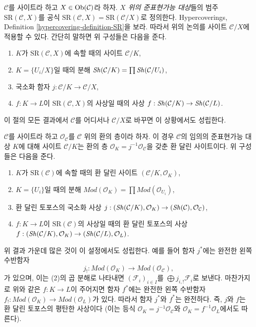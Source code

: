 \begin{remark}[대상 위에서의 변형]
\label{remark-semi-representable-over-object}
$\mathcal{C}$를 사이트라 하고 $X \in \mathop{\mathrm{Ob}}\nolimits(\mathcal{C})$라 하자.
{\it $X$ 위의 준표현가능 대상}들의 범주
$\text{SR}(\mathcal{C}, X)$를 공식
$\text{SR}(\mathcal{C}, X) = \text{SR}(\mathcal{C}/X)$로 정의한다.
Hypercoverings, Definition \ref{hypercovering-definition-SR}을 보라.
따라서 위의 논의를 사이트 $\mathcal{C}/X$에 적용할 수 있다.
간단히 말하면 위 구성들은 다음을 준다.
\begin{enumerate}
\item $K$가 $\text{SR}(\mathcal{C}, X)$에 속할 때의 사이트 $\mathcal{C}/K$,
\item $K = \{U_i/X\}$일 때의 분해
$\mathop{\mathit{Sh}}\nolimits(\mathcal{C}/K) = \prod \mathop{\mathit{Sh}}\nolimits(\mathcal{C}/U_i)$,
\item 국소화 함자 $j : \mathcal{C}/K \to \mathcal{C}/X$,
\item $f : K \to L$이 $\text{SR}(\mathcal{C}, X)$의 사상일 때의 사상
$f : \mathop{\mathit{Sh}}\nolimits(\mathcal{C}/K) \to \mathop{\mathit{Sh}}\nolimits(\mathcal{C}/L)$.
\end{enumerate}
이 절의 모든 결과에서 $\mathcal{C}$를 어디서나 $\mathcal{C}/X$로
바꾸면 이 상황에서도 성립한다.
\end{remark}

\begin{remark}[환 달린 변형]
\label{remark-semi-representable-ringed}
$\mathcal{C}$를 사이트라 하고 $\mathcal{O}_\mathcal{C}$를
$\mathcal{C}$ 위의 환의 층이라 하자. 이 경우 $\mathcal{C}$의 임의의
준표현가능 대상 $K$에 대해 사이트 $\mathcal{C}/K$는 환의 층
$\mathcal{O}_K = j^{-1}\mathcal{O}_\mathcal{C}$을 갖춘 환 달린 사이트이다.
위 구성들은 다음을 준다.
\begin{enumerate}
\item $K$가 $\text{SR}(\mathcal{C})$에 속할 때의 환 달린 사이트
$(\mathcal{C}/K, \mathcal{O}_K)$,
\item $K = \{U_i\}$일 때의 분해
$\textit{Mod}(\mathcal{O}_K) =
\prod \textit{Mod}(\mathcal{O}_{U_i})$,
\item 환 달린 토포스의 국소화 사상
$j : (\mathop{\mathit{Sh}}\nolimits(\mathcal{C}/K), \mathcal{O}_K) \to
(\mathop{\mathit{Sh}}\nolimits(\mathcal{C}), \mathcal{O}_\mathcal{C})$,
\item $f : K \to L$이 $\text{SR}(\mathcal{C})$의 사상일 때의
환 달린 토포스의 사상
$f : (\mathop{\mathit{Sh}}\nolimits(\mathcal{C}/K), \mathcal{O}_K) \to
(\mathop{\mathit{Sh}}\nolimits(\mathcal{C}/L), \mathcal{O}_L)$.
\end{enumerate}
위 결과 가운데 많은 것이 이 설정에서도 성립한다. 예를 들어
함자 $j^*$에는 완전한 왼쪽 수반함자
$$
j_! : \textit{Mod}(\mathcal{O}_K) \to \textit{Mod}(\mathcal{O}_\mathcal{C}),
$$
가 있으며, 이는 (2)의 곱 분해로 나타내면
$(\mathcal{F}_i)_{i \in I}$를 $\bigoplus j_{i, !}\mathcal{F}_i$로 보낸다.
마찬가지로 위와 같은 $f : K \to L$이 주어지면 함자 $f^*$에는
완전한 왼쪽 수반함자
$f_! : \textit{Mod}(\mathcal{O}_K) \to \textit{Mod}(\mathcal{O}_L)$가 있다.
따라서 함자 $j^*$와 $f^*$는 완전하다. 즉, $j$와 $f$는
환 달린 토포스의 평탄한 사상이다
(이는 등식 $\mathcal{O}_K = j^{-1}\mathcal{O}_\mathcal{C}$와
$\mathcal{O}_K = f^{-1}\mathcal{O}_L$에서도 따른다).
\end{remark}


